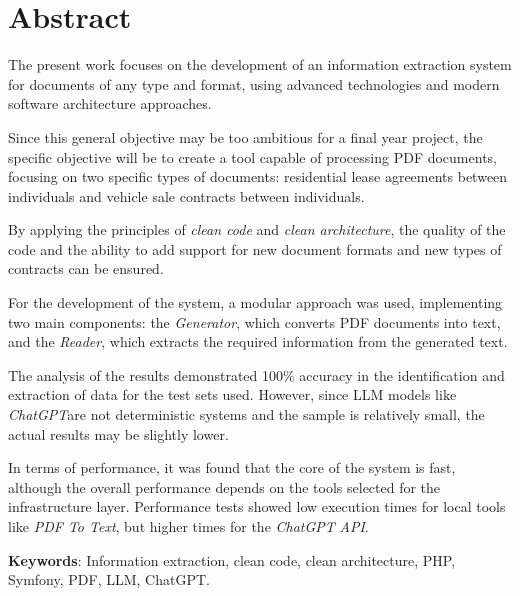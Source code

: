 \newpage
\section*{Abstract}

The present work focuses on the development of an information extraction system for documents of any type and format,
using advanced technologies and modern software architecture approaches.

Since this general objective may be too ambitious for a final year project, the specific objective will be to create a
tool capable of processing PDF documents, focusing on two specific types of documents: residential lease agreements
between individuals and vehicle sale contracts between individuals.

By applying the principles of \textit{clean code} and \textit{clean architecture}, the quality of the code and the
ability to add support for new document formats and new types of contracts can be ensured.

For the development of the system, a modular approach was used, implementing two main components: the
\textit{Generator}, which converts PDF documents into text, and the \textit{Reader}, which extracts the required
information from the generated text.

The analysis of the results demonstrated 100\% accuracy in the identification and extraction of data for the test
sets used.
However, since LLM models like \textit{ChatGPT}are not deterministic systems and the sample is relatively small, the
actual results may be slightly lower.

In terms of performance, it was found that the core of the system is fast, although the overall performance depends on
the tools selected for the infrastructure layer.
Performance tests showed low execution times for local tools like \textit{PDF To Text}, but higher times for the
\textit{ChatGPT} \textit{API}.



\vspace{1cm}

\textbf{Keywords}: Information extraction, clean code, clean architecture, PHP, Symfony, PDF, LLM, ChatGPT.

